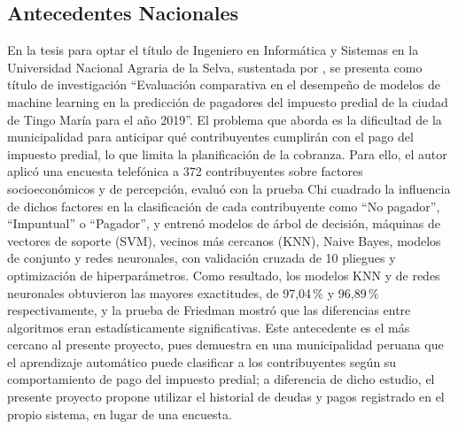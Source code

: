 \documentclass[12pt,a4paper]{report}
\begin{document}
\subsection{Antecedentes Nacionales}

En la tesis para optar el título de Ingeniero en Informática y Sistemas en la Universidad Nacional Agraria de la Selva, sustentada por \textcite{juncoaranciaga2023}, se presenta como título de investigación ``Evaluación comparativa en el desempeño de modelos de machine learning en la predicción de pagadores del impuesto predial de la ciudad de Tingo María para el año 2019''. El problema que aborda es la dificultad de la municipalidad para anticipar qué contribuyentes cumplirán con el pago del impuesto predial, lo que limita la planificación de la cobranza. Para ello, el autor aplicó una encuesta telefónica a 372 contribuyentes sobre factores socioeconómicos y de percepción, evaluó con la prueba Chi cuadrado la influencia de dichos factores en la clasificación de cada contribuyente como ``No pagador'', ``Impuntual'' o ``Pagador'', y entrenó modelos de árbol de decisión, máquinas de vectores de soporte (SVM), vecinos más cercanos (KNN), Naive Bayes, modelos de conjunto y redes neuronales, con validación cruzada de 10 pliegues y optimización de hiperparámetros. Como resultado, los modelos KNN y de redes neuronales obtuvieron las mayores exactitudes, de 97,04\,\% y 96,89\,\% respectivamente, y la prueba de Friedman mostró que las diferencias entre algoritmos eran estadísticamente significativas. Este antecedente es el más cercano al presente proyecto, pues demuestra en una municipalidad peruana que el aprendizaje automático puede clasificar a los contribuyentes según su comportamiento de pago del impuesto predial; a diferencia de dicho estudio, el presente proyecto propone utilizar el historial de deudas y pagos registrado en el propio sistema, en lugar de una encuesta.
\end{document}

